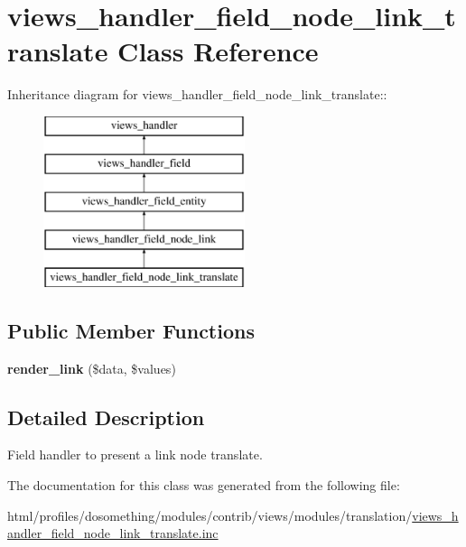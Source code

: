 \hypertarget{classviews__handler__field__node__link__translate}{
\section{views\_\-handler\_\-field\_\-node\_\-link\_\-translate Class Reference}
\label{classviews__handler__field__node__link__translate}
}
Inheritance diagram for views\_\-handler\_\-field\_\-node\_\-link\_\-translate::\begin{figure}[H]
\begin{center}
\leavevmode
\includegraphics[height=5cm]{classviews__handler__field__node__link__translate}
\end{center}
\end{figure}
\subsection*{Public Member Functions}
\begin{DoxyCompactItemize}
\item 
\hypertarget{classviews__handler__field__node__link__translate_a2552f2b781bdc2177d331cafd413eb93}{
{\bfseries render\_\-link} (\$data, \$values)}
\label{classviews__handler__field__node__link__translate_a2552f2b781bdc2177d331cafd413eb93}

\end{DoxyCompactItemize}


\subsection{Detailed Description}
Field handler to present a link node translate. 

The documentation for this class was generated from the following file:\begin{DoxyCompactItemize}
\item 
html/profiles/dosomething/modules/contrib/views/modules/translation/\hyperlink{views__handler__field__node__link__translate_8inc}{views\_\-handler\_\-field\_\-node\_\-link\_\-translate.inc}\end{DoxyCompactItemize}
